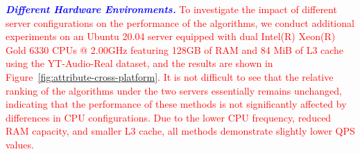 \documentclass[sigconf, nonacm]{acmart}
\begin{document}
{{		%
	}
	
	\textit{\textbf{\textcolor{blue}{Different Hardware Environments.}}} 
	\textcolor{red}{To investigate the impact of different server configurations on the performance of the algorithms, we conduct additional experiments on an Ubuntu 20.04 server equipped with dual Intel(R) Xeon(R) Gold 6330 CPUs @ 2.00GHz featuring 128GB of RAM and 84 MiB of L3 cache using the YT-Audio-Real dataset, and the results are shown in Figure~\ref{fig:attribute-cross-platform}. It is not difficult to see that the relative ranking of the algorithms under the two servers essentially remains unchanged, indicating that the performance of these methods is not significantly affected by differences in CPU configurations. Due to the lower CPU frequency, reduced RAM capacity, and smaller L3 cache, all methods demonstrate slightly lower QPS values.}

}
\end{document}
